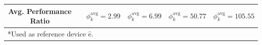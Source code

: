 \begin{table}
\begin{tabular}{c|r|rr|rr|rr|rr}
\hline
Avg. Performance Ratio  & & \multicolumn{2}{r|}{$\phi_{k}^{\mathrm{avg}} = 2.99$} & \multicolumn{2}{r|}{$\phi_{k}^{\mathrm{avg}} = 6.99$} & \multicolumn{2}{r|}{$\phi_{k}^{\mathrm{avg}} = 50.77$}  & \multicolumn{2}{r}{$\phi_{k}^{\mathrm{avg}} = 105.55$}\\

\bottomrule

\multicolumn{6}{l}{\scriptsize{*Used as reference device $\hat{\mathrm{e}}$.}}\\
\end{tabular}
\end{table}